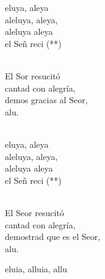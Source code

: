 \documentclass[12pt]{article}
\begin{document}
\begin{multicols*}{2}
\begin{cancion}%
	\begin{chorus}%
	eluya, aleya\\
	aleluya, aleya,\\
	aleluya aleya\\
	el Señ reci (**)  \\
	\end{chorus}%
	\jump\\
	El Sor resucitó \\
cantad con alegría,\\
	demos gracias al Seor,\\
	alu.\\\jump\\
	\begin{chorus}%
	eluya, aleya\\
	aleluya, aleya,\\
	aleluya aleya\\
	el Señ reci (**)  \\
	\end{chorus}%
	\jump\\
	El Seor resucitó\\
cantad con alegría,\\
	demostrad que es el Seor,\\
	alu.\\
\end{cancion}%

\begin{cancion}[Alleluia 7][Taizé]%
	eluia, alluia, allu  \\
\end{cancion}%


\end{multicols*}
\end{document}
